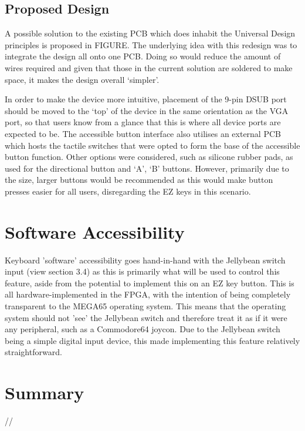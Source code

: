 \subsection{Proposed Design}

A possible solution to the existing PCB which does inhabit the Universal Design principles is proposed in FIGURE. 
The underlying idea with this redesign was to integrate the design all onto one PCB. 
Doing so would reduce the amount of wires required and given that those in the current solution are soldered to make space, it makes the design overall ‘simpler’.

In order to make the device more intuitive, placement of the 9-pin DSUB port should be moved to the ‘top’ of the device in the same orientation as the VGA port, so that users know from a glance that this is where all device ports are expected to be.
The accessible button interface also utilises an external PCB which hosts the tactile switches that were opted to form the base of the accessible button function. 
Other options were considered, such as silicone rubber pads, as used for the directional button and ‘A’, ‘B’ buttons. 
However, primarily due to the size, larger buttons would be recommended as this would make button presses easier for all users, disregarding the EZ keys in this scenario.


\section{Software Accessibility}
Keyboard 'software' accessibility goes hand-in-hand with the Jellybean switch input (view section 3.4) as this is primarily what will be used to control this feature, aside from the potential to implement this on an EZ key button.
This is all hardware-implemented in the FPGA, with the intention of being completely transparent to the MEGA65 operating system.
This means that the operating system should not 'see' the Jellybean switch and therefore treat it as if it were any peripheral, such as a Commodore64 joycon.
Due to the Jellybean switch being a simple digital input device, this made implementing this feature relatively straightforward.



\section{Summary}
//